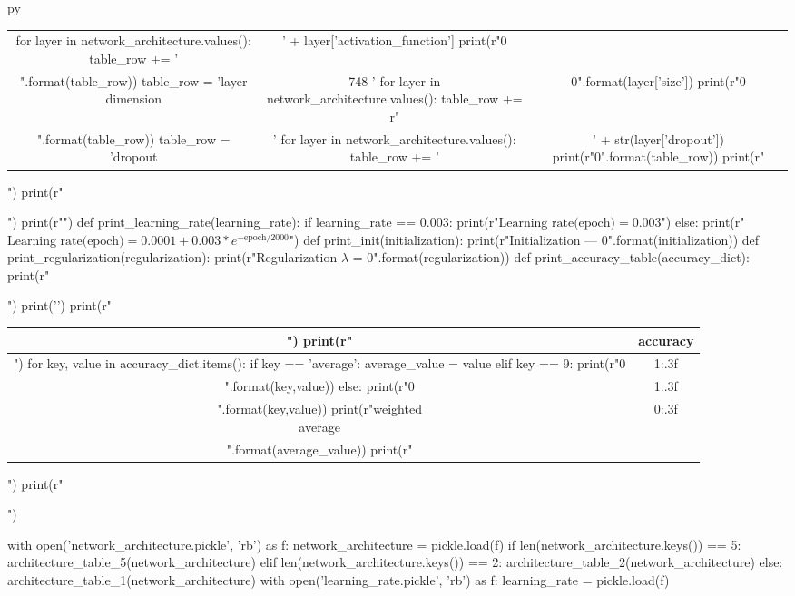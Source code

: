 \documentclass[11pt]{article}
\begin{document}
\begin{pythontexcustomcode}{py}
\begin{table}[H]
\begin{tabular}{cc|c}
    for layer in network_architecture.values():
        table_row += ' & ' + layer['activation_function']
    print(r"{0} \\".format(table_row))
    table_row = 'layer dimension & \LARGE 748 '
    for layer in network_architecture.values():
        table_row += r"& \LARGE {0}".format(layer['size'])
    print(r"{0} \\".format(table_row))
    table_row = 'dropout & '
    for layer in network_architecture.values():
        table_row += '& ' + str(layer['dropout'])
    print(r"{0}".format(table_row))
    print(r"\end{tabular}")
    print(r"\end{table}")
    print(r"")
def print_learning_rate(learning_rate):
    if learning_rate == 0.003:
        print(r"$\textrm{Learning rate(epoch)} = 0.003$")
    else:
        print(r"$\textrm{Learning rate(epoch)} = 0.0001 + 0.003 * e^{- \textrm{epoch}/2000}$")
def print_init(initialization):
    print(r"Initialization --- {0}".format(initialization))
def print_regularization(regularization):
    print(r"Regularization $\lambda$ = {0}".format(regularization))
def print_accuracy_table(accuracy_dict):
    print(r"\begin{table}[H]")
    print('\centering')
    print(r"\begin{tabular}{c|c}")
    print(r" & accuracy \\ \hline")
    for key, value in accuracy_dict.items():
        if key == 'average':
            average_value = value
        elif key == 9:
            print(r"{0} & {1:.3f} \\ \hline".format(key,value))
        else:
            print(r"{0} & {1:.3f} \\".format(key,value))
    print(r"\makecell{{weighted \\ average}} & {0:.3f} \\".format(average_value))
    print(r"\end{tabular}")
    print(r"\end{table}")
\end{pythontexcustomcode}
\begin{pycode}
with open('network_architecture.pickle', 'rb') as f:
    network_architecture = pickle.load(f)
if len(network_architecture.keys()) == 5:
    architecture_table_5(network_architecture)
elif len(network_architecture.keys()) == 2:
    architecture_table_2(network_architecture)
else:
    architecture_table_1(network_architecture)
with open('learning_rate.pickle', 'rb') as f:
    learning_rate = pickle.load(f)
\end{pycode}
\end{document}
